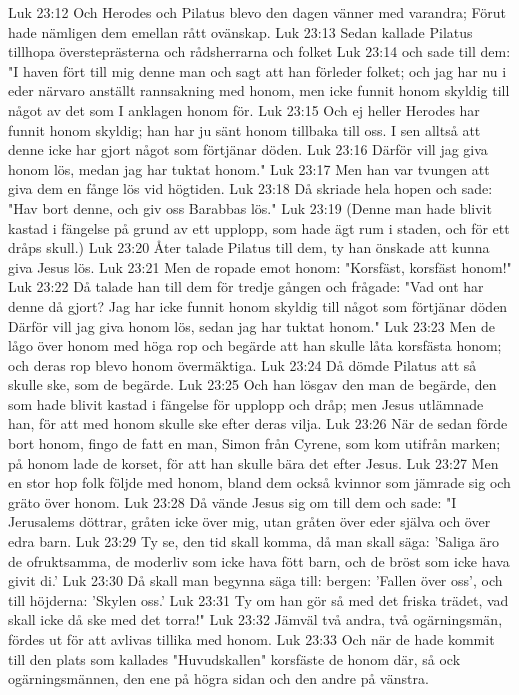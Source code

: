 Luk 23:12  Och Herodes och Pilatus blevo den dagen vänner med varandra; Förut hade nämligen dem emellan rått ovänskap.
Luk 23:13  Sedan kallade Pilatus tillhopa översteprästerna och rådsherrarna och folket
Luk 23:14  och sade till dem: "I haven fört till mig denne man och sagt att han förleder folket; och jag har nu i eder närvaro anställt rannsakning med honom, men icke funnit honom skyldig till något av det som I anklagen honom för.
Luk 23:15  Och ej heller Herodes har funnit honom skyldig; han har ju sänt honom tillbaka till oss. I sen alltså att denne icke har gjort något som förtjänar döden.
Luk 23:16  Därför vill jag giva honom lös, medan jag har tuktat honom."
Luk 23:17  Men han var tvungen att giva dem en fånge lös vid högtiden.
Luk 23:18  Då skriade hela hopen och sade: "Hav bort denne, och giv oss Barabbas lös."
Luk 23:19  (Denne man hade blivit kastad i fängelse på grund av ett upplopp, som hade ägt rum i staden, och för ett dråps skull.)
Luk 23:20  Åter talade Pilatus till dem, ty han önskade att kunna giva Jesus lös.
Luk 23:21  Men de ropade emot honom: "Korsfäst, korsfäst honom!"
Luk 23:22  Då talade han till dem för tredje gången och frågade: "Vad ont har denne då gjort? Jag har icke funnit honom skyldig till något som förtjänar döden Därför vill jag giva honom lös, sedan jag har tuktat honom."
Luk 23:23  Men de lågo över honom med höga rop och begärde att han skulle låta korsfästa honom; och deras rop blevo honom övermäktiga.
Luk 23:24  Då dömde Pilatus att så skulle ske, som de begärde.
Luk 23:25  Och han lösgav den man de begärde, den som hade blivit kastad i fängelse för upplopp och dråp; men Jesus utlämnade han, för att med honom skulle ske efter deras vilja.
Luk 23:26  När de sedan förde bort honom, fingo de fatt en man, Simon från Cyrene, som kom utifrån marken; på honom lade de korset, för att han skulle bära det efter Jesus.
Luk 23:27  Men en stor hop folk följde med honom, bland dem också kvinnor som jämrade sig och gräto över honom.
Luk 23:28  Då vände Jesus sig om till dem och sade: "I Jerusalems döttrar, gråten icke över mig, utan gråten över eder själva och över edra barn.
Luk 23:29  Ty se, den tid skall komma, då man skall säga: 'Saliga äro de ofruktsamma, de moderliv som icke hava fött barn, och de bröst som icke hava givit di.'
Luk 23:30  Då skall man begynna säga till: bergen: 'Fallen över oss', och till höjderna: 'Skylen oss.'
Luk 23:31  Ty om han gör så med det friska trädet, vad skall icke då ske med det torra!"
Luk 23:32  Jämväl två andra, två ogärningsmän, fördes ut för att avlivas tillika med honom.
Luk 23:33  Och när de hade kommit till den plats som kallades "Huvudskallen" korsfäste de honom där, så ock ogärningsmännen, den ene på högra sidan och den andre på vänstra.
